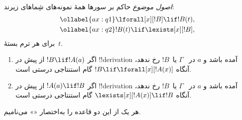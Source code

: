 \documentclass[../../../include/open-logic-section]{subfiles}
\begin{document}


\begin{defn}
\emph{اصول موضوع} حاکم بر سورها همهٔ نمونه‌های شِماهای زیرند:
\begin{align}
\ollabel{ax:q1} & \lforall[x][!B] \lif !B(t), \\
\ollabel{ax:q2} & !B(t) \lif \lexists[x][!B],
\end{align}
برای هر ترم بستهٔ~$t$.
\end{defn}

\begin{defn}
\begin{enumerate}
\item اگر $!B \lif !A(a)$ از پیش در !!{derivation} آمده باشد و $a$ در
  ~$\Gamma$ یا~$!B$ رخ ندهد، آنگاه $!B \lif
  \lforall[x][!A(x)]$ گام استنتاجی درستی است.
\item اگر $!A(a) \lif !B$ از پیش در !!{derivation} آمده باشد و $a$ در
  ~$\Gamma$ یا~$!B$ رخ ندهد، آنگاه $\lexists[x][!A(x)] \lif
  !B$ گام استنتاجی درستی است.
\end{enumerate}
\end{defn}

هر یک از این دو قاعده را به‌اختصار «\QR» می‌نامیم.
\end{document}
